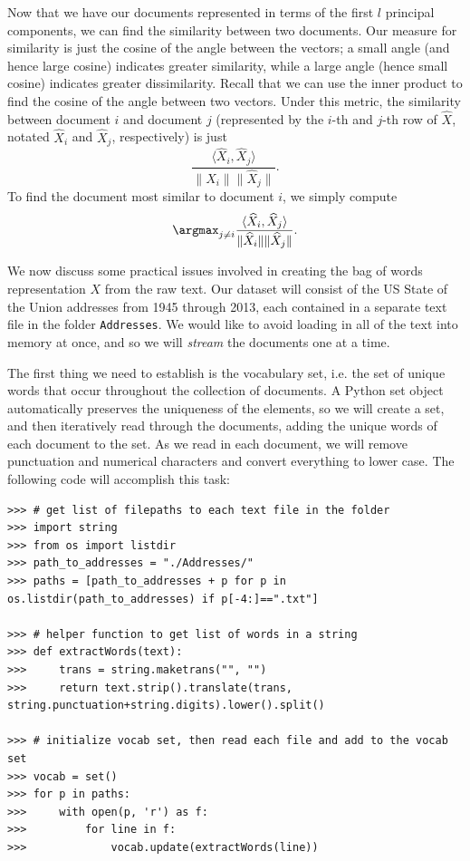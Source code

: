 Now that we have our documents represented in terms of the first $l$ principal components, we can find the similarity between two documents.
Our measure for similarity is just the cosine of the angle between the vectors; a small angle (and hence large cosine) indicates greater similarity, while a large angle (hence small cosine)
indicates greater dissimilarity.
Recall that we can use the inner product to find the cosine of the angle between two vectors.
Under this metric, the similarity between document $i$ and document $j$ (represented by the $i$-th and $j$-th row of $\widehat{X}$, notated $\widehat{X}_i$ and $\widehat{X}_j$, respectively) is just
\[
\frac{\langle \widehat{X}_i, \widehat{X}_j\rangle}{\|\widehat{X}_i\|\|\widehat{X}_j\|}.
\]
To find the document most similar to document $i$, we simply compute
\[
\argmax_{j\neq i} \frac{\langle \widehat{X}_i, \widehat{X}_j\rangle}{\|\widehat{X}_i\|\|\widehat{X}_j\|}.
\]


We now discuss some practical issues involved in creating the bag of words representation $X$ from the raw text.
Our dataset will consist of the US State of the Union addresses from 1945 through 2013, each contained in a separate text file in the folder {\tt Addresses}.
We would like to avoid loading in all of the text into memory at once, and so we will \emph{stream} the documents one at a time.

The first thing we need to establish is the vocabulary set, i.e. the set of unique words that occur throughout the collection of documents.
A Python set object automatically preserves the uniqueness of the elements, so we will create a set, and then iteratively read through the documents, adding the unique words of each
document to the set. As we read in each document, we will remove punctuation and numerical characters and convert everything to lower case.
The following code will accomplish this task:
\begin{lstlisting}
>>> # get list of filepaths to each text file in the folder
>>> import string
>>> from os import listdir
>>> path_to_addresses = "./Addresses/"
>>> paths = [path_to_addresses + p for p in os.listdir(path_to_addresses) if p[-4:]==".txt"]

>>> # helper function to get list of words in a string
>>> def extractWords(text):
>>>     trans = string.maketrans("", "")
>>>     return text.strip().translate(trans, string.punctuation+string.digits).lower().split()

>>> # initialize vocab set, then read each file and add to the vocab set
>>> vocab = set()
>>> for p in paths:
>>>     with open(p, 'r') as f:
>>>         for line in f:
>>>             vocab.update(extractWords(line))
\end{lstlisting}

